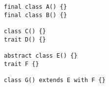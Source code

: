 \begin{lstlisting}[style=scalaioScala]
final class A() {}
final class B() {}

class C() {}
trait D() {}

abstract class E() {}
trait F {}

class G() extends E with F {}
\end{lstlisting}

